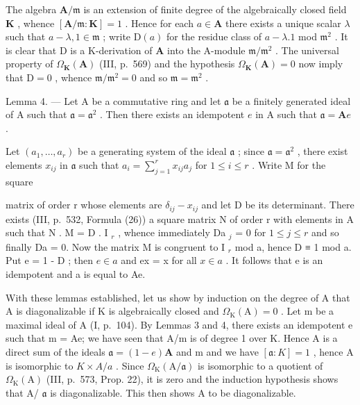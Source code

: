 The algebra \(\mathbf{A} / \mathfrak{m}\) is an extension of finite degree of the algebraically closed field \(\mathbf{K}\) , whence \([\mathbf{A} / \mathfrak{m}:\mathbf{K}] = 1\) . Hence for each \(a\in \mathbf{A}\) there exists a unique scalar \(\lambda\) such that \(a - \lambda ,1\in \mathfrak{m}\) ; write \(\mathrm{D}(a)\) for the residue class of \(a - \lambda .1\) mod \(\mathfrak{m}^2\) . It is clear that \(\mathrm{D}\) is a K-derivation of \(\mathbf{A}\) into the A-module \(\mathfrak{m} / \mathfrak{m}^2\) . The universal property of \(\Omega_{\mathbf{K}}(\mathbf{A})\) (III, p.~569) and the hypothesis \(\Omega_{\mathbf{K}}(\mathbf{A}) = 0\) now imply that \(\mathrm{D} = 0\) , whence \(\mathfrak{m} / \mathfrak{m}^2 = 0\) and so \(\mathfrak{m} = \mathfrak{m}^2\) .

Lemma 4. --- Let A be a commutative ring and let \(\mathfrak{a}\) be a finitely generated ideal of A such that \(\mathfrak{a} = \mathfrak{a}^2\) . Then there exists an idempotent \(e\) in A such that \(\mathfrak{a} = \mathbf{A}e\) .

Let \((a_{1},\ldots ,a_{r})\) be a generating system of the ideal \(\mathfrak{a}\) ; since \(\mathfrak{a} = \mathfrak{a}^2\) , there exist elements \(x_{ij}\) in \(\mathfrak{a}\) such that \(a_{i} = \sum_{j = 1}^{r}x_{ij}a_{j}\) for \(1\leqslant i\leqslant r\) . Write M for the square

matrix of order r whose elements are \(\delta_{ij} - x_{ij}\) and let D be its determinant. There exists (III, p.~532, Formula (26)) a square matrix N of order r with elements in A such that N . M = D . I \(_{r}\) , whence immediately Da \(_{j}\) = 0 for \(1 \leqslant j \leqslant r\) and so finally Da = 0. Now the matrix M is congruent to I \(_{r}\) mod a, hence D ≡ 1 mod a. Put e = 1 - D ; then \(e \in a\) and ex = x for all \(x \in a\) . It follows that e is an idempotent and a is equal to Ae.

With these lemmas established, let us show by induction on the degree of A that A is diagonalizable if K is algebraically closed and \(\Omega_{\mathrm{K}}(\mathrm{A})=0\) . Let m be a maximal ideal of A (I, p.~104). By Lemmas 3 and 4, there exists an idempotent e such that m = Ae; we have seen that A/m is of degree 1 over K. Hence A is a direct sum of the ideals \(\mathfrak{a}=(1-e)\mathbf{A}\) and m and we have \([\mathfrak{a}:K]=1\) , hence A is isomorphic to \(K\times A/a\) . Since \(\Omega_{\mathrm{K}}(\mathrm{A}/\mathfrak{a})\) is isomorphic to a quotient of \(\Omega_{\mathrm{K}}(\mathrm{A})\) (III, p.~573, Prop. 22), it is zero and the induction hypothesis shows that A/ \(\mathfrak{a}\) is diagonalizable. This then shows A to be diagonalizable.


